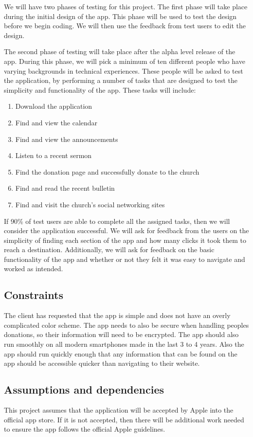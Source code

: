 \documentclass[letterpaper,10pt,draftclsnofoot,onecolumn,compsoc,titlepage]{IEEEtran}
\begin{document}
	We will have two phases of testing for this project. 
	The first phase will take place during the initial design of the app. 
	This phase will be used to test the design before we begin coding.
	We will then use the feedback from test users to edit the design.
	
	The second phase of testing will take place after the alpha level release of the app. 
	During this phase, we will pick a minimum of ten different people who have varying backgrounds in technical experiences. 
	These people will be asked to test the application, by performing a number of tasks that are designed to test the simplicity and functionality of the app. 
	These tasks will include: 
	\begin{enumerate}
		\item{Download the application}
		\item{Find and view the calendar}
		\item{Find and view the announcements}
		\item{Listen to a recent sermon}
		\item{Find the donation page and successfully donate to the church}
		\item{Find and read the recent bulletin}
		\item{Find and visit the church's social networking sites}
	\end{enumerate}
	If 90\% of test users are able to complete all the assigned tasks, then we will consider the application successful. 
	We will ask for feedback from the users on the simplicity of finding each section of the app and how many clicks it took them to reach a destination.
	Additionally, we will ask for feedback on the basic functionality of the app and whether or not they felt it was easy to navigate and worked as intended.

	\subsection{Constraints}
	The client has requested that the app is simple and does not have an overly complicated color scheme.
	The app needs to also be secure when handling peoples donations, so their information will need to be encrypted.
	The app should also run smoothly on all modern smartphones made in the last 3 to 4 years.
	Also the app should run quickly enough that any information that can be found on the app should be accessible quicker than navigating to their website.

	\subsection{Assumptions and dependencies}
	This project assumes that the application will be accepted by Apple into the official app store.
	If it is not accepted, then there will be additional work needed to ensure the app follows the official Apple guidelines.
\end{document}
